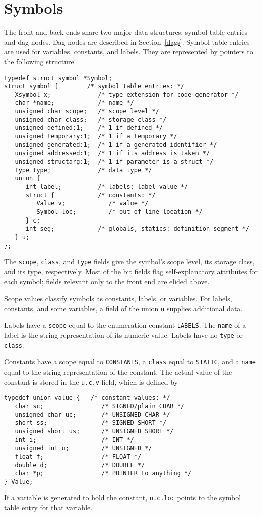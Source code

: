 \section{Symbols}

\label{symbols}
The front and back ends share two major data structures: symbol table
entries and dag nodes. Dag nodes are described in Section~\ref{dags}.
Symbol table entries are used for variables, constants, and labels.
They are represented by pointers to the following structure.
\begin{verbatim}
typedef struct symbol *Symbol;
struct symbol {        /* symbol table entries: */
   Xsymbol x;             /* type extension for code generator */
   char *name;            /* name */
   unsigned char scope;   /* scope level */
   unsigned char class;   /* storage class */
   unsigned defined:1;    /* 1 if defined */
   unsigned temporary:1;  /* 1 if a temporary */
   unsigned generated:1;  /* 1 if a generated identifier */
   unsigned addressed:1;  /* 1 if its address is taken */
   unsigned structarg:1;  /* 1 if parameter is a struct */
   Type type;             /* data type */
   union {
      int label;          /* labels: label value */
      struct {            /* constants: */
         Value v;            /* value */
         Symbol loc;         /* out-of-line location */
      } c;
      int seg;            /* globals, statics: definition segment */
   } u;
};
\end{verbatim}
The \verb|scope|, \verb|class|, and \verb|type| fields give the symbol's
scope level, its storage class, and its type, respectively.
Most of the bit fields flag self-explanatory attributes for each symbol;
fields relevant only to the front end are elided above.

Scope values classify symbols as constants, labels, or variables.
For labels, constants, and some variables,
a field of the union \verb|u| supplies additional data.

Labels have a \verb|scope| equal to the enumeration constant \verb|LABELS|. The \verb|name|
of a label is the string representation of its numeric value.
Labels have no \verb|type| or \verb|class|.

Constants have a scope equal to \verb|CONSTANTS|, a \verb|class| equal
to \verb|STATIC|, and a \verb|name|
equal to the string representation of the constant.
The actual value of the constant is stored in the \verb|u.c.v| field,
which is defined by
\begin{verbatim}
typedef union value {   /* constant values: */
   char sc;                /* SIGNED/plain CHAR */
   unsigned char uc;       /* UNSIGNED CHAR */
   short ss;               /* SIGNED SHORT */
   unsigned short us;      /* UNSIGNED SHORT */
   int i;                  /* INT */
   unsigned int u;         /* UNSIGNED */
   float f;                /* FLOAT */
   double d;               /* DOUBLE */
   char *p;                /* POINTER to anything */
} Value;
\end{verbatim}
If a variable is generated to hold the constant,
\verb|u.c.loc| points to the symbol table entry for that variable.

